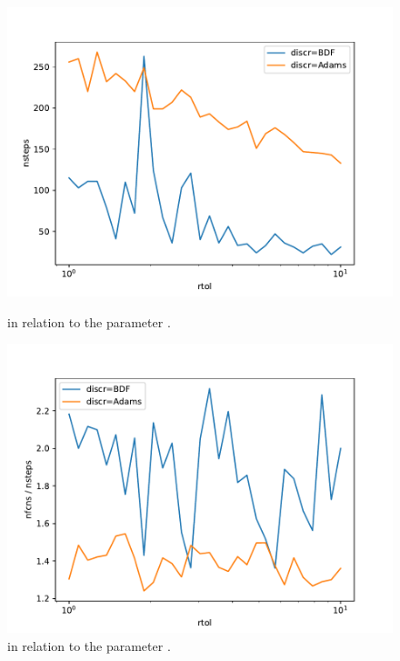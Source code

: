 \documentclass{report}
\begin{document}
\begin{figure}[h]
\centering
\begin{minipage}[b]{0.45\textwidth}
\centering
\includegraphics[width=\textwidth]{../Plots/Task4/Figure_300}
\caption{ in relation to the parameter .}
\label{pl:nsteps2}
\end{minipage}
\hfill
\begin{minipage}[b]{0.45\textwidth}
\centering
\includegraphics[width=\textwidth]{../Plots/Task4/Figure_310}
\caption{ in relation to the parameter .}
\label{pl:nfcns_nsteps2}
\end{minipage}
\end{figure}
\end{document}
